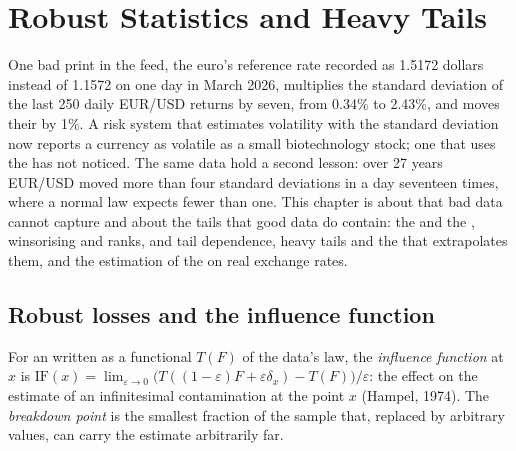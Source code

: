 \chapter{Robust Statistics and Heavy Tails}\label{ch:qm:robust-statistics-and-heavy-tails}

One bad print in the feed, the euro's reference rate recorded as 1.5172 dollars instead of 1.1572 on one day in March 2026, multiplies
the standard deviation of the last 250 daily EUR/USD returns by seven, from 0.34\% to 2.43\%, and moves their  by 1\%. A risk system that estimates volatility with the standard deviation now reports a currency as volatile as a small
biotechnology stock; one that uses the  has not noticed. The same data hold a second lesson: over 27 years
EUR/USD moved more than four standard deviations in a day seventeen times, where a normal law expects fewer than one. This chapter
is about  that bad data cannot capture and about the tails that good data do contain: the  and the
, winsorising and ranks,  and tail dependence, heavy tails and the  that extrapolates them,
and the estimation of the  on real exchange rates.

\section{Robust losses and the influence function}

\begin{definition}\label{def:qm:robust-statistics-and-heavy-tails:influence}
For an  written as a functional $T(F)$ of the data's law, the \emph{influence function} at $x$ is
$\mathrm{IF}(x) = \lim_{\varepsilon \to 0}\bigl(T((1 - \varepsilon)F + \varepsilon\delta_x) - T(F)\bigr)/\varepsilon$: the effect on the
estimate of an infinitesimal contamination at the point $x$ (Hampel, 1974). The \emph{breakdown point} is the
smallest fraction of the sample that, replaced by arbitrary values, can carry the estimate arbitrarily far.
\end{definition}

